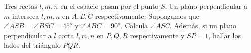 Tres rectas $l,m,n$ en el espacio pasan por el punto $S$. Un plano perpendicular a $m$ interseca $l,m,n$ en $A,B,C$ respectivamente. Supongamos que $\angle ASB = \angle BSC = 45^o$ y $\angle ABC = 90^o$. Calcula $\angle ASC$. Además, si un plano perpendicular a $l$ corta $l,m,n$ en $P,Q,R$ respectivamente y $SP = 1$, hallar los lados del triángulo $PQR$.



